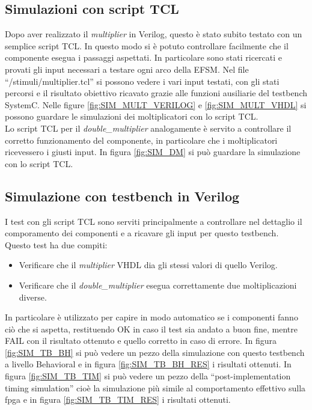 \documentclass[]{IEEEtran}
\begin{document}
\subsection{Simulazioni con script TCL}
Dopo aver realizzato il \textit{multiplier} in Verilog, questo è stato subito testato con un semplice script TCL. In questo modo si è potuto controllare facilmente che il componente esegua i passaggi aspettati. In particolare sono stati ricercati e provati gli input necessari a testare ogni arco della EFSM. Nel file ``/stimuli/multiplier.tcl'' si possono vedere i vari input testati, con gli stati percorsi e il risultato obiettivo ricavato grazie alle funzioni ausiliarie del testbench SystemC. Nelle figure \ref{fig:SIM_MULT_VERILOG} e \ref{fig:SIM_MULT_VHDL} si possono guardare le simulazioni dei moltiplicatori con lo script TCL.
\\Lo script TCL per il \textit{double\_multiplier} analogamente è servito a controllare il corretto funzionamento del componente, in particolare che i moltiplicatori ricevessero i giusti input. In figura \ref{fig:SIM_DM} si può guardare la simulazione con lo script TCL.


\subsection{Simulazione con testbench in Verilog}
I test con gli script TCL sono serviti principalmente a controllare nel dettaglio il comporamento dei componenti e a ricavare gli input per questo testbench.
\\Questo test ha due compiti:
\begin{itemize}
    \item Verificare che il \textit{multiplier} VHDL dia gli stessi valori di quello Verilog.
    \item Verificare che il \textit{double\_multiplier} esegua correttamente due moltiplicazioni diverse.
\end{itemize}
In particolare è utilizzato per capire in modo automatico se i componenti fanno ciò che si aspetta, restituendo OK in caso il test sia andato a buon fine, mentre FAIL con il risultato ottenuto e quello corretto in caso di errore.
In figura \ref{fig:SIM_TB_BH} si può vedere un pezzo della simulazione con questo testbench a livello Behavioral e in figura \ref{fig:SIM_TB_BH_RES} i risultati ottenuti.
In figura \ref{fig:SIM_TB_TIM} si può vedere un pezzo della ``post-implementation timing simulation'' cioè la simulazione più simile al comportamento effettivo sulla fpga e in figura \ref{fig:SIM_TB_TIM_RES} i risultati ottenuti.
\end{document}
